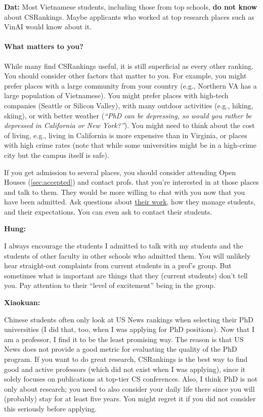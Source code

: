 \documentclass[oneside,11pt,dvipsnames]{book}
\newenvironment{commentbox}[1][]{
  \small
  \begin{mybox}
    {\small \textbf{#1}}
  }{
  \end{mybox}
}
\begin{document}
\begin{commentbox}[Dat:] Most Vietnamese students, including those from top schools, \textbf{do not know} about CSRankings.  Maybe applicants who worked at top research places such as VinAI would know about it.
\end{commentbox}

\paragraph{What matters to you?} While many find CSRankings useful, it is still superficial as every other ranking.  You should consider other factors that matter to you.  For example, you might prefer places with a large community from your country (e.g., Northern VA has a large population of Vietnamese). You might prefer places with high-tech companies (Seattle or Silicon Valley), with many outdoor activities (e.g., hiking, skiing), or with better weather (\emph{``PhD can be depressing, so would you rather be depressed in California or New York?''}).  You might need to think about the cost of living, e.g., living in California is more expensive than in Virginia, or places with high crime rates (note that while some universities might be in a high-crime city but the campus itself is safe).

If you get admission to several places, you should consider attending Open Houses (\autoref{sec:accepted}) and contact profs. that you're interested in at those places and talk to them.  They would be more willing to chat with you now that you have been admitted.  Ask questions about \href{https://github.com/dynaroars/dynaroars.github.io/wiki/Answers-to-Ph.D-Advisor-Guide}{their work}, how they manage students, and their expectations. You can even ask to contact their students.

\begin{commentbox}[Hung:]
  I always encourage the students I admitted to talk with my students and the students of other faculty in other schools who admitted them. You will unlikely hear straight-out complaints from current students in a prof’s group. But sometimes what is important are things that they (current students) don’t tell you. Pay attention to their ``level of excitement'' being in the group.
\end{commentbox}

\begin{commentbox}[Xiaokuan:]
  Chinese students often only look at US News rankings when selecting their PhD universities (I did that, too, when I was applying for PhD positions).
  Now that I am a professor, I find it to be the least promising way.
  The reason is that US News does not provide a good metric for evaluating the quality of the PhD program.
  If you want to do great research, CSRankings is the best way to find good and active professors (which did not exist when I was applying),
  since it solely focuses on publications at top-tier CS conferences.
  Also,
  I think PhD is not only about research;
  you need to also consider your daily life there since you will (probably) stay for at least five years.
  You might regret it if you did not consider this seriously before applying.
\end{commentbox}
\end{document}

